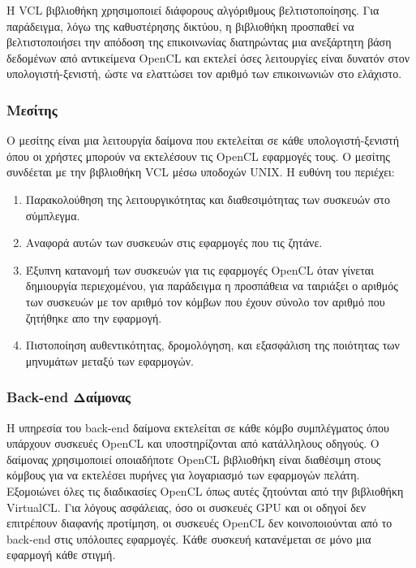 Η VCL βιβλιοθήκη χρησιμοποιεί διάφορους αλγόριθμους βελτιστοποίησης. Για παράδειγμα, λόγω της καθυστέρησης δικτύου, η βιβλιοθήκη προσπαθεί να βελτιστοποιήσει την απόδοση της επικοινωνίας διατηρώντας μια ανεξάρτητη βάση δεδομένων από αντικείμενα OpenCL και εκτελεί όσες λειτουργίες είναι δυνατόν στον υπολογιστή-ξενιστή, ώστε να ελαττώσει τον αριθμό των επικοινωνιών στο ελάχιστο.\cite{virtualcl-3}
\subsubsection{Μεσίτης}
Ο μεσίτης είναι μια λειτουργία δαίμονα που εκτελείται σε κάθε υπολογιστή-ξενιστή όπου οι χρήστες μπορούν να εκτελέσουν τις OpenCL εφαρμογές τους. Ο μεσίτης συνδέεται με την βιβλιοθήκη VCL μέσω υποδοχών UNIX. Η ευθύνη του περιέχει:
\begin{enumerate}
\item Παρακολούθηση της λειτουργικότητας και διαθεσιμότητας των συσκευών στο σύμπλεγμα.
\item Αναφορά αυτών των συσκευών στις εφαρμογές που τις ζητάνε.
\item Έξυπνη κατανομή των συσκευών για τις εφαρμογές OpenCL όταν γίνεται δημιουργία περιεχομένου, για παράδειγμα η προσπάθεια να ταιριάξει ο αριθμός των συσκευών με τον αριθμό τον κόμβων που έχουν σύνολο τον αριθμό που ζητήθηκε απο την εφαρμογή.
\item Πιστοποίηση αυθεντικότητας, δρομολόγηση, και εξασφάλιση της ποιότητας των μηνυμάτων μεταξύ των εφαρμογών. 
\end{enumerate}

\subsubsection{Back-end Δαίμονας}
Η υπηρεσία του back-end δαίμονα εκτελείται σε κάθε κόμβο συμπλέγματος όπου υπάρχουν συσκευές OpenCL και υποστηρίζονται από κατάλληλους οδηγούς. Ο δαίμονας χρησιμοποιεί οποιαδήποτε OpenCL βιβλιοθήκη είναι διαθέσιμη στους κόμβους για να εκτελέσει πυρήνες για λογαριασμό των εφαρμογών πελάτη. Εξομοιώνει όλες τις διαδικασίες OpenCL όπως αυτές ζητούνται από την βιβλιοθήκη VirtualCL. Για λόγους ασφάλειας, όσο οι συσκευές GPU και οι οδηγοί δεν επιτρέπουν διαφανής προτίμηση, οι συσκευές OpenCL δεν κοινοποιούνται από το back-end στις υπόλοιπες εφαρμογές. Κάθε συσκευή κατανέμεται σε μόνο μια εφαρμογή κάθε στιγμή.\cite{virtualcl-4}



